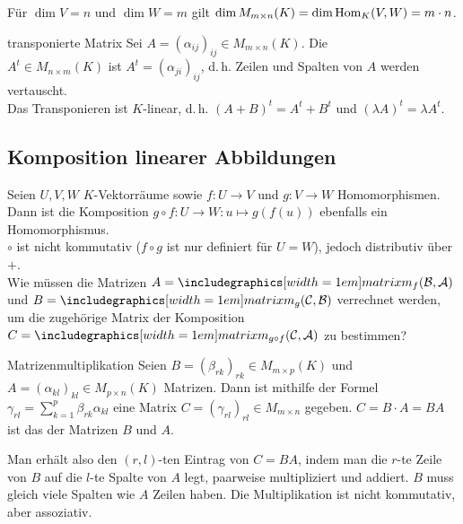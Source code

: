 \begin{Kor}
    Für $\dim V = n$ und $\dim W = m$ gilt
    $\dim M_{m \times n}(K) = \dim \operatorname{Hom}_K(V, W) = m \cdot n$.
\end{Kor}

\begin{Def}{transponierte Matrix}
    Sei $A = (\alpha_{ij})_{ij} \in M_{m \times n}(K)$.
    Die  \\
    $A^t \in M_{n \times m}(K)$ ist
    $A^t = (\alpha_{ji})_{ij}$, d.\,h. Zeilen und Spalten von $A$ werden
    vertauscht. \\
    Das Transponieren ist $K$-linear, d.\,h. $(A + B)^t = A^t + B^t$ und
    $(\lambda A)^t = \lambda A^t$.
\end{Def}

\subsection{%
    Komposition linearer Abbildungen%
}

\begin{Bem}
    Seien $U, V, W$ $K$-Vektorräume sowie $f: U \rightarrow V$ und
    $g: V \rightarrow W$ Homomorphismen.
    Dann ist die Komposition $g \circ f: U \rightarrow W: u \mapsto g(f(u))$
    ebenfalls ein Homomorphismus. \\
    $\circ$ ist nicht kommutativ ($f \circ g$ ist nur definiert für $U = W$),
    jedoch distributiv über $+$. \\
    Wie müssen die Matrizen $A = \hommatrix{f}{B}{A}$ und
    $B = \hommatrix{g}{C}{B}$ verrechnet werden, um die zugehörige Matrix
    der Komposition $C = \hommatrix{g \circ f}{C}{A}$ zu bestimmen?
\end{Bem}

\begin{Def}{Matrizenmultiplikation}
    Seien $B = (\beta_{rk})_{rk} \in M_{m \times p}(K)$ und
    $A = (\alpha_{kl})_{kl} \in M_{p \times n}(K)$ Matrizen.
    Dann ist mithilfe der Formel
    $\gamma_{rl} = \sum_{k=1}^p \beta_{rk} \alpha_{kl}$ eine Matrix
    $C = (\gamma_{rl})_{rl} \in M_{m \times n}$ gegeben.
    $C = B \cdot A = BA$ ist das  der Matrizen $B$ und $A$.
\end{Def}

\begin{Bem}
    Man erhält also den $(r, l)$-ten Eintrag von $C = BA$, indem
    man die $r$-te Zeile von $B$ auf die $l$-te Spalte von $A$ legt,
    paarweise multipliziert und addiert.
    $B$ muss gleich viele Spalten wie $A$ Zeilen haben.
    Die Multiplikation ist nicht kommutativ, aber assoziativ.
\end{Bem}

